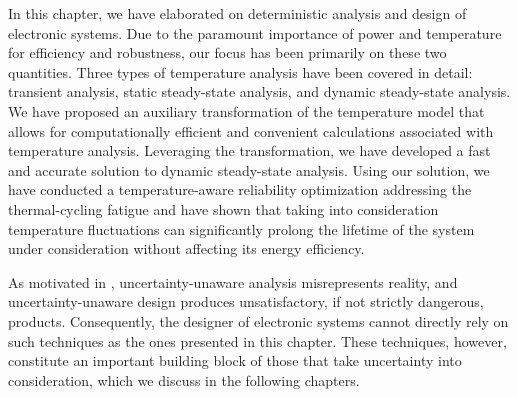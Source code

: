 In this chapter, we have elaborated on deterministic analysis and design of
electronic systems. Due to the paramount importance of power and temperature for
efficiency and robustness, our focus has been primarily on these two quantities.
Three types of temperature analysis have been covered in detail: transient
analysis, static steady-state analysis, and dynamic steady-state analysis. We
have proposed an auxiliary transformation of the temperature model that allows
for computationally efficient and convenient calculations associated with
temperature analysis. Leveraging the transformation, we have developed a fast
and accurate solution to dynamic steady-state analysis. Using our solution, we
have conducted a temperature-aware reliability optimization addressing the
thermal-cycling fatigue and have shown that taking into consideration
temperature fluctuations can significantly prolong the lifetime of the system
under consideration without affecting its energy efficiency.

As motivated in , uncertainty-unaware analysis misrepresents
reality, and uncertainty-unaware design produces unsatisfactory, if not strictly
dangerous, products. Consequently, the designer of electronic systems cannot
directly rely on such techniques as the ones presented in this chapter. These
techniques, however, constitute an important building block of those that take
uncertainty into consideration, which we discuss in the following chapters.
